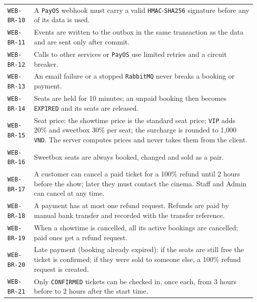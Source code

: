 \begin{longtable}{@{}P{0.23000\SRSWidth}P{0.77000\SRSWidth}@{}}
\texttt{WEB-\allowbreak{}BR-\allowbreak{}10} & A \texttt{Pay\allowbreak{}OS} webhook must carry a valid \texttt{HMAC}-\texttt{SHA256} signature before any of its data is used. \\[3pt]
\texttt{WEB-\allowbreak{}BR-\allowbreak{}11} & Events are written to the outbox in the same transaction as the data and are sent only after commit. \\[3pt]
\texttt{WEB-\allowbreak{}BR-\allowbreak{}12} & Calls to other services or \texttt{Pay\allowbreak{}OS} use limited retries and a circuit breaker. \\[3pt]
\texttt{WEB-\allowbreak{}BR-\allowbreak{}13} & An email failure or a stopped \texttt{Rabbit\allowbreak{}MQ} never breaks a booking or payment. \\[3pt]
\texttt{WEB-\allowbreak{}BR-\allowbreak{}14} & Seats are held for 10 minutes; an unpaid booking then becomes \texttt{EXPIRED} and its seats are released. \\[3pt]
\texttt{WEB-\allowbreak{}BR-\allowbreak{}15} & Seat price: the showtime price is the standard seat price; \texttt{VIP} adds 20\% and sweetbox 30\% per seat; the surcharge is rounded to 1,000 \texttt{VND}. The server computes prices and never takes them from the client. \\[3pt]
\texttt{WEB-\allowbreak{}BR-\allowbreak{}16} & Sweetbox seats are always booked, changed and sold as a pair. \\[3pt]
\texttt{WEB-\allowbreak{}BR-\allowbreak{}17} & A customer can cancel a paid ticket for a 100\% refund until 2 hours before the show; later they must contact the cinema. Staff and Admin can cancel at any time. \\[3pt]
\texttt{WEB-\allowbreak{}BR-\allowbreak{}18} & A payment has at most one refund request. Refunds are paid by manual bank transfer and recorded with the transfer reference. \\[3pt]
\texttt{WEB-\allowbreak{}BR-\allowbreak{}19} & When a showtime is cancelled, all its active bookings are cancelled; paid ones get a refund request. \\[3pt]
\texttt{WEB-\allowbreak{}BR-\allowbreak{}20} & Late payment (booking already expired): if the seats are still free the ticket is confirmed; if they were sold to someone else, a 100\% refund request is created. \\[3pt]
\texttt{WEB-\allowbreak{}BR-\allowbreak{}21} & Only \texttt{CONFIRME\allowbreak{}D} tickets can be checked in, once each, from 3 hours before to 2 hours after the start time. \\[3pt]

\end{longtable}
